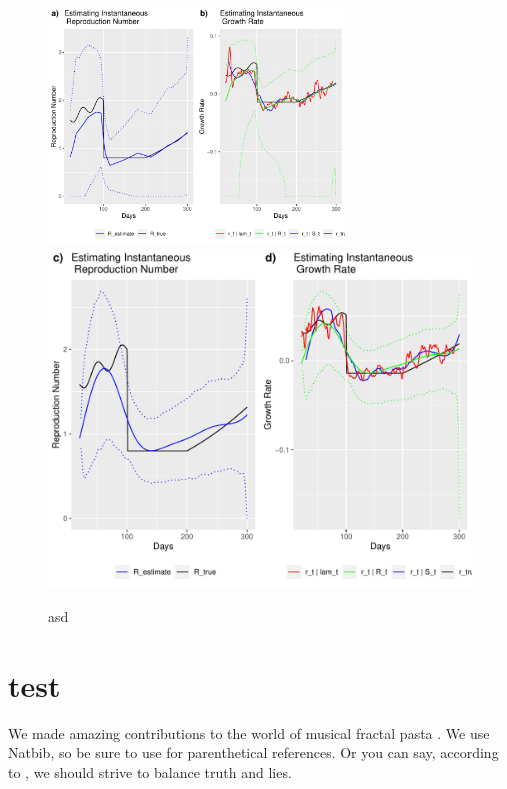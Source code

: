 \documentclass[12pt]{article}
\begin{document}
      \newpage

      \begin{figure}[h]
        \centering
        \includegraphics[width = 0.7\textwidth]{weird_fn_1.pdf}
        \includegraphics[width = 0.7\linewidth]{weird_fn_3.pdf}
        \caption{asd}
        \label{fig: comp}
      \end{figure}
      



  \section{test}
    We made amazing contributions to the world of musical fractal pasta 
    \citep{McDonald2017,Tibshirani2013}. We use Natbib, so be sure to use
    \citep{Stein1981} for parenthetical references. Or you can say, according to
    \citet{HastieTibshirani2009}, we should strive to balance truth and lies.




\end{document}
